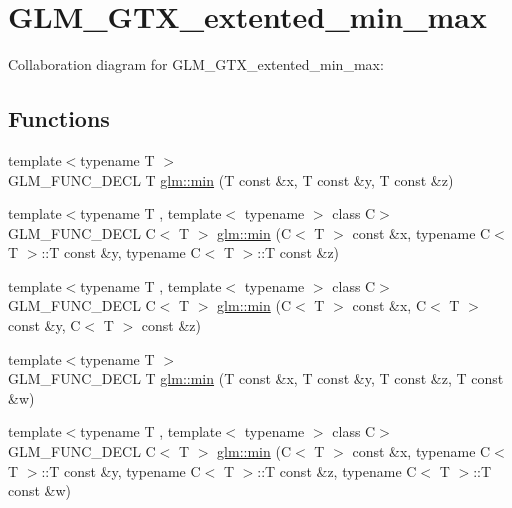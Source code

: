 \hypertarget{group__gtx__extented__min__max}{\section{G\-L\-M\-\_\-\-G\-T\-X\-\_\-extented\-\_\-min\-\_\-max}
\label{group__gtx__extented__min__max}
}
Collaboration diagram for G\-L\-M\-\_\-\-G\-T\-X\-\_\-extented\-\_\-min\-\_\-max\-:
\subsection*{Functions}
\begin{DoxyCompactItemize}
\item 
{\footnotesize template$<$typename T $>$ }\\G\-L\-M\-\_\-\-F\-U\-N\-C\-\_\-\-D\-E\-C\-L T \hyperlink{group__gtx__extented__min__max_ga713d3f9b3e76312c0d314e0c8611a6a6}{glm\-::min} (T const \&x, T const \&y, T const \&z)
\item 
{\footnotesize template$<$typename T , template$<$ typename $>$ class C$>$ }\\G\-L\-M\-\_\-\-F\-U\-N\-C\-\_\-\-D\-E\-C\-L C$<$ T $>$ \hyperlink{group__gtx__extented__min__max_ga74d1a96e7cdbac40f6d35142d3bcbbd4}{glm\-::min} (C$<$ T $>$ const \&x, typename C$<$ T $>$\-::T const \&y, typename C$<$ T $>$\-::T const \&z)
\item 
{\footnotesize template$<$typename T , template$<$ typename $>$ class C$>$ }\\G\-L\-M\-\_\-\-F\-U\-N\-C\-\_\-\-D\-E\-C\-L C$<$ T $>$ \hyperlink{group__gtx__extented__min__max_ga42b5c3fc027fd3d9a50d2ccc9126d9f0}{glm\-::min} (C$<$ T $>$ const \&x, C$<$ T $>$ const \&y, C$<$ T $>$ const \&z)
\item 
{\footnotesize template$<$typename T $>$ }\\G\-L\-M\-\_\-\-F\-U\-N\-C\-\_\-\-D\-E\-C\-L T \hyperlink{group__gtx__extented__min__max_ga95466987024d03039607f09e69813d69}{glm\-::min} (T const \&x, T const \&y, T const \&z, T const \&w)
\item 
{\footnotesize template$<$typename T , template$<$ typename $>$ class C$>$ }\\G\-L\-M\-\_\-\-F\-U\-N\-C\-\_\-\-D\-E\-C\-L C$<$ T $>$ \hyperlink{group__gtx__extented__min__max_ga4fe35dd31dd0c45693c9b60b830b8d47}{glm\-::min} (C$<$ T $>$ const \&x, typename C$<$ T $>$\-::T const \&y, typename C$<$ T $>$\-::T const \&z, typename C$<$ T $>$\-::T const \&w)

\end{DoxyCompactItemize}
